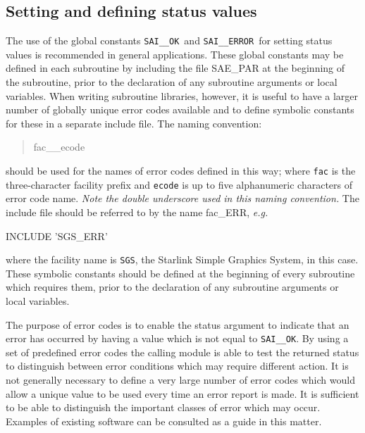 \documentclass[twoside,11pt]{starlink}
\providecommand{\const}[1]{\texttt{#1}}
\providecommand{\saiok}{\const{SAI\_\_OK}}
\providecommand{\saierr}{\const{SAI\_\_ERROR}}
\begin{document}
\subsection{Setting and defining status values \label{def_sect}}

The use of the global constants \saiok\ and \saierr\ for setting
status values is recommended in general applications.
These global constants may be defined in each subroutine by including the
file SAE\_PAR at the beginning of the subroutine, prior to the declaration
of any subroutine arguments or local variables.
When writing subroutine libraries, however, it is useful to have a larger
number of globally unique error codes available and to define symbolic
constants for these in a separate include
file.
The naming convention:

\begin {quote}
\begin {small}
\begin{terminalv}
fac__ecode
\end{terminalv}
\end {small}
\end {quote}

should be used for the names of error codes defined in this way; where
\texttt{fac} is the three-character facility prefix and \texttt{ecode} is up
to five alphanumeric characters of error code name.
\emph{Note the double underscore used in this naming convention.}
The include file should be referred to by the name fac\_ERR, \textit{e.g.}

\begin {small}
\begin{terminalv}
      INCLUDE 'SGS_ERR'
\end{terminalv}
\end {small}

where the facility name is \texttt{SGS}, the Starlink Simple Graphics System,
in this case.
These symbolic constants should be defined at the beginning of every
subroutine which requires them, prior to the declaration of any subroutine
arguments or local variables.

The purpose of error codes is to enable the status argument to indicate that an
error has occurred by having a value which is not equal to \saiok.
By using a set of predefined error codes the calling module is
able to test the returned status to distinguish between error conditions
which may require different action.
It is not generally necessary to define a very large number of error codes
which would allow a unique value to be used every time an error report is
made.
It is sufficient to be able to distinguish the important classes of error which
may occur.
Examples of existing software can be consulted as a guide in this matter.
\end{document}
